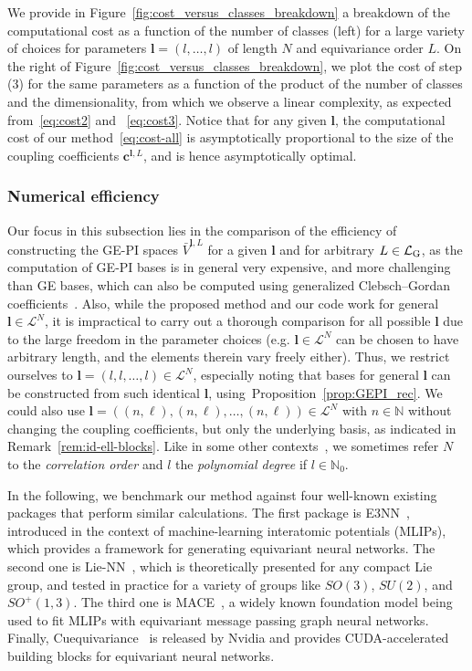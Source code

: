\documentclass{article}
\newcommand{\bV}{{\bar V}}
\numberwithin{equation}{section}
\def\N{\mathbb{N}}
\def\bc{{\bm c}}
\def\bl{{\bm l}}
\def\calL{\mathcal{L}}
\def\calLG{\mathcal{\calL_{\rm G}}}
\def\Nat{{N}}
\begin{document}
 We provide in Figure~\ref{fig:cost_versus_classes_breakdown}  a breakdown of the computational cost as a function of the number of classes (left) for a large variety of choices for parameters $\bl= (l,\ldots,l)$ of length $\Nat$ and equivariance order $L$.  On the right of Figure~\ref{fig:cost_versus_classes_breakdown},
we plot the cost of step (3) for the same parameters as a function of the product of the number of classes and the dimensionality, from which we observe a linear complexity, as expected from~\eqref{eq:cost2} and ~\eqref{eq:cost3}. Notice that for any given $\bl$, the computational cost of our method~\eqref{eq:cost-all} is asymptotically proportional to the size of the coupling coefficients $\bc^{\bl,L}$, and is hence asymptotically optimal.


\subsubsection{Numerical efficiency}



Our focus in this subsection lies in the comparison of the efficiency of constructing the GE-PI spaces $\bV^{\bl,L}$ for a given $\bl$ and for arbitrary $L\in\calLG$, as the computation of GE-PI bases is in general very expensive, and more challenging than GE bases, which can also be computed using generalized Clebsch--Gordan coefficients~\cite{Dusson2022-ie}. Also, while the proposed method and our code work for general $\bl\in\calL^\Nat$, it is impractical to carry out a thorough comparison for all possible $\bl$ due to the large freedom in the parameter choices (e.g. $\bl\in\calL^N$ can be chosen to have arbitrary length, and the elements therein vary freely either). Thus, we restrict ourselves to 
$\bl=(l,l,\ldots,l)\in\calL^\Nat$, especially noting that bases for general $\bl$ can be constructed from such identical $\bl$, using~Proposition~\ref{prop:GEPI_rec}. 
We could also use $\bl=((n,\ell),(n,\ell),\ldots,(n,\ell))\in\calL^\Nat$ with $n\in\N$ without changing the coupling coefficients, but only the underlying basis, as indicated in Remark~\ref{rem:id-ell-blocks}.
Like in some other contexts~\cite{Dusson2022-ie,Batatia2022-zi}, we sometimes refer $\Nat$ to the \emph{correlation order} and $l$ the \emph{polynomial degree} if $l\in\N_0$.



In the following, we benchmark our method against four well-known existing packages that perform similar calculations.
The first package is E3NN~\cite{geiger2022e3nn}, introduced in the context of machine-learning interatomic potentials (MLIPs), which provides a framework for generating equivariant neural networks. 
The second one is Lie-NN~\cite{Batatia2023-us},
which is theoretically presented for any compact Lie group, and tested in practice for a variety of  groups like $SO(3)$, $SU(2)$, and $SO^+(1,3)$. 
The third one is MACE~\cite{Batatia2022-zi},  a widely known foundation model being used to fit MLIPs with equivariant message passing graph neural networks.
Finally, Cuequivariance~\cite{geiger2024accelerate} is released by Nvidia  and provides CUDA-accelerated building blocks for equivariant neural networks.
\end{document}
